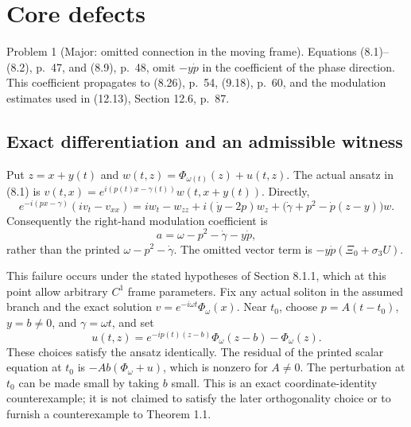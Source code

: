 \documentclass[10pt]{article}
\begin{document}
\section*{Core defects}
Problem 1 (Major: omitted connection in the moving frame).  Equations (8.1)–(8.2), p. 47, and (8.9), p. 48, omit \(-y\dot p\) in the coefficient of the phase direction. This coefficient propagates to (8.26), p. 54, (9.18), p. 60, and the modulation estimates used in (12.13), Section 12.6, p. 87.\par
\subsection*{Exact differentiation and an admissible witness}
Put \(z=x+y(t)\) and \(w(t,z)=\Phi_{\omega(t)}(z)+u(t,z)\). The actual ansatz in (8.1) is \(v(t,x)=e^{i(p(t)x-\gamma(t))}w(t,x+y(t))\). Directly, \[e^{-i(px-\gamma)}(iv_t-v_{xx})
 =iw_t-w_{zz}+i(\dot y-2p)w_z+
   \bigl(\dot\gamma+p^2-\dot p(z-y)\bigr)w .\] Consequently the right-hand modulation coefficient is \[a=\omega-p^2-\dot\gamma-y\dot p,\] rather than the printed \(\omega-p^2-\dot\gamma\). The omitted vector term is \(-y\dot p(\Xi_0+\sigma_3U)\).\par
This failure occurs under the stated hypotheses of Section 8.1.1, which at this point allow arbitrary \(C^1\) frame parameters. Fix any actual soliton in the assumed branch and the exact solution \(v=e^{-i\omega t}\Phi_\omega(x)\). Near \(t_0\), choose \(p=A(t-t_0)\), \(y=b\ne0\), and \(\gamma=\omega t\), and set \[u(t,z)=e^{-ip(t)(z-b)}\Phi_\omega(z-b)-\Phi_\omega(z).\] These choices satisfy the ansatz identically. The residual of the printed scalar equation at \(t_0\) is \(-Ab(\Phi_\omega+u)\), which is nonzero for \(A\ne0\). The perturbation at \(t_0\) can be made small by taking \(b\) small. This is an exact coordinate-identity counterexample; it is not claimed to satisfy the later orthogonality choice or to furnish a counterexample to Theorem 1.1.\par
\end{document}

